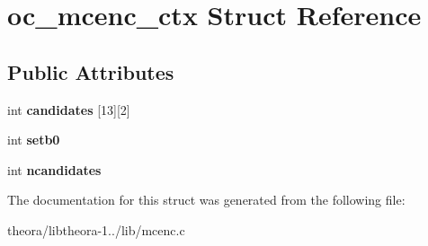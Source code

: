 \hypertarget{structoc__mcenc__ctx}{\section{oc\+\_\+mcenc\+\_\+ctx Struct Reference}
\label{structoc__mcenc__ctx}
}
\subsection*{Public Attributes}
\begin{DoxyCompactItemize}
\item 
\hypertarget{structoc__mcenc__ctx_ab85ac130a23d509278b2e68c7e30d7ed}{int {\bfseries candidates} \mbox{[}13\mbox{]}\mbox{[}2\mbox{]}}\label{structoc__mcenc__ctx_ab85ac130a23d509278b2e68c7e30d7ed}

\item 
\hypertarget{structoc__mcenc__ctx_aac16724d8f328cf99d8c0fbaf71010ab}{int {\bfseries setb0}}\label{structoc__mcenc__ctx_aac16724d8f328cf99d8c0fbaf71010ab}

\item 
\hypertarget{structoc__mcenc__ctx_a0e9dc1cf5905a33e3c6cf00cd0432d9a}{int {\bfseries ncandidates}}\label{structoc__mcenc__ctx_a0e9dc1cf5905a33e3c6cf00cd0432d9a}

\end{DoxyCompactItemize}


The documentation for this struct was generated from the following file\+:\begin{DoxyCompactItemize}
\item 
theora/libtheora-\/1../lib/mcenc.\+c\end{DoxyCompactItemize}
